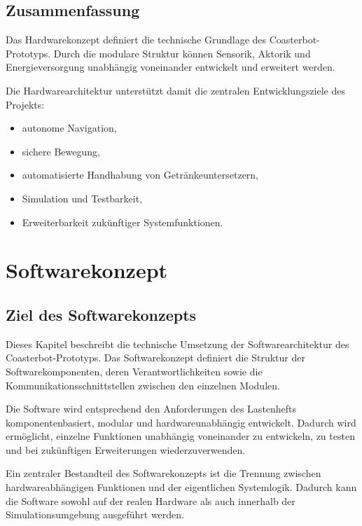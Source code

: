 \documentclass[
  a4paper,
  12pt,
  DIV=12,        %
  parskip=half,  %
  headings=small %
]{scrartcl}
\theoremstyle{definition}
\providecommand{\tightlist}{%
  \setlength{\itemsep}{0pt}\setlength{\parskip}{0pt}}
\theoremstyle{definition}
\begin{document}
\subsection{Zusammenfassung}\label{zusammenfassung-1}

Das Hardwarekonzept definiert die technische Grundlage des
Coasterbot-Prototyps. Durch die modulare Struktur können Sensorik,
Aktorik und Energieversorgung unabhängig voneinander entwickelt und
erweitert werden.

Die Hardwarearchitektur unterstützt damit die zentralen
Entwicklungsziele des Projekts:

\begin{itemize}
\tightlist
\item
  autonome Navigation,
\item
  sichere Bewegung,
\item
  automatisierte Handhabung von Getränkeuntersetzern,
\item
  Simulation und Testbarkeit,
\item
  Erweiterbarkeit zukünftiger Systemfunktionen.
\end{itemize}

\section{Softwarekonzept}\label{softwarekonzept}

\subsection{Ziel des Softwarekonzepts}\label{ziel-des-softwarekonzepts}

Dieses Kapitel beschreibt die technische Umsetzung der
Softwarearchitektur des Coasterbot-Prototyps. Das Softwarekonzept
definiert die Struktur der Softwarekomponenten, deren
Verantwortlichkeiten sowie die Kommunikationsschnittstellen zwischen den
einzelnen Modulen.

Die Software wird entsprechend den Anforderungen des Lastenhefts
komponentenbasiert, modular und hardwareunabhängig entwickelt. Dadurch
wird ermöglicht, einzelne Funktionen unabhängig voneinander zu
entwickeln, zu testen und bei zukünftigen Erweiterungen
wiederzuverwenden.

Ein zentraler Bestandteil des Softwarekonzepts ist die Trennung zwischen
hardwareabhängigen Funktionen und der eigentlichen Systemlogik. Dadurch
kann die Software sowohl auf der realen Hardware als auch innerhalb der
Simulationsumgebung ausgeführt werden.
\end{document}
